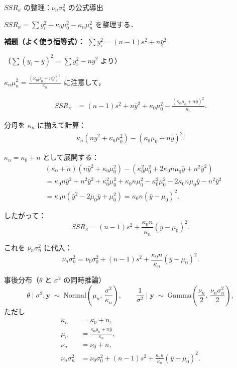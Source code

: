 \documentclass[lualatex,ja=standard,a4paper,12pt]{bxjsarticle}
\begin{document}
\begin{derivbox}{$SSR_\kappa$ の整理：$\nu_n\sigma_n^2$ の公式導出}

$SSR_\kappa = \sum y_i^2 + \kappa_0\mu_0^2 - \kappa_n\mu_n^2$ を整理する．

\noindent\textbf{補題（よく使う恒等式）：} $\sum y_i^2 = (n-1)s^2 + n\bar{y}^2$

（$\sum(y_i-\bar{y})^2 = \sum y_i^2 - n\bar{y}^2$ より）

\medskip

$\kappa_n\mu_n^2 = \frac{(\kappa_0\mu_0 + n\bar{y})^2}{\kappa_n}$ に注意して，

\begin{align*}
  SSR_\kappa
  &= (n-1)s^2 + n\bar{y}^2 + \kappa_0\mu_0^2
     - \frac{(\kappa_0\mu_0 + n\bar{y})^2}{\kappa_n}.
\end{align*}

分母を $\kappa_n$ に揃えて計算：
\begin{align*}
  \kappa_n(n\bar{y}^2 + \kappa_0\mu_0^2) - (\kappa_0\mu_0 + n\bar{y})^2.
\end{align*}

$\kappa_n = \kappa_0 + n$ として展開する：
\begin{align*}
  &(\kappa_0+n)(n\bar{y}^2 + \kappa_0\mu_0^2)
   - (\kappa_0^2\mu_0^2 + 2\kappa_0 n\mu_0\bar{y} + n^2\bar{y}^2) \\
  &= \kappa_0 n\bar{y}^2 + n^2\bar{y}^2
     + \kappa_0^2\mu_0^2 + \kappa_0 n\mu_0^2
     - \kappa_0^2\mu_0^2 - 2\kappa_0 n\mu_0\bar{y} - n^2\bar{y}^2 \\
  &= \kappa_0 n(\bar{y}^2 - 2\mu_0\bar{y} + \mu_0^2)
   = \kappa_0 n(\bar{y} - \mu_0)^2.
\end{align*}

したがって：
\[
  SSR_\kappa = (n-1)s^2 + \frac{\kappa_0 n}{\kappa_n}(\bar{y} - \mu_0)^2.
\]

これを $\nu_n\sigma_n^2$ に代入：
\[
  \boxed{\nu_n\sigma_n^2
  = \nu_0\sigma_0^2 + (n-1)s^2 + \frac{\kappa_0 n}{\kappa_n}(\bar{y} - \mu_0)^2.}
\]
\end{derivbox}

\begin{thmbox}{事後分布（$\theta$ と $\sigma^2$ の同時推論）}
\[
  \theta \mid \sigma^2, \mathbf{y}
  \;\sim\; \mathrm{Normal}\!\left(\mu_n,\, \frac{\sigma^2}{\kappa_n}\right),
  \qquad
  \frac{1}{\sigma^2} \mid \mathbf{y}
  \;\sim\; \mathrm{Gamma}\!\left(\frac{\nu_n}{2},\, \frac{\nu_n\sigma_n^2}{2}\right),
\]
ただし
\begin{align*}
  \kappa_n &= \kappa_0 + n, \\
  \mu_n &= \frac{\kappa_0\mu_0 + n\bar{y}}{\kappa_n}, \\
  \nu_n &= \nu_0 + n, \\
  \nu_n\sigma_n^2 &= \nu_0\sigma_0^2 + (n-1)s^2
    + \frac{\kappa_0 n}{\kappa_n}(\bar{y} - \mu_0)^2.
\end{align*}
\end{thmbox}
\end{document}
